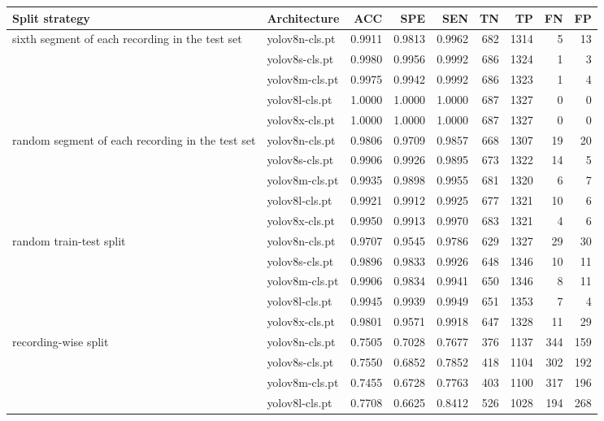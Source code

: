 \begin{table*}
    \centering
    \begin{tabular}{llrrrrrrr}
        \toprule
         Split strategy & Architecture & ACC & SPE & SEN & TN & TP & FN & FP \\
            \midrule
			\multirow{5}{10em}{sixth segment of each recording in the test set} & yolov8n-cls.pt & 0.9911 & 0.9813 & 0.9962 & 682 & 1314 & 5 & 13 \\
			 & yolov8s-cls.pt & 0.9980 & 0.9956 & 0.9992 & 686 & 1324 & 1 & 3 \\
			 & yolov8m-cls.pt & 0.9975 & 0.9942 & 0.9992 & 686 & 1323 & 1 & 4 \\
			 & yolov8l-cls.pt & 1.0000 & 1.0000 & 1.0000 & 687 & 1327 & 0 & 0 \\
			 & yolov8x-cls.pt & 1.0000 & 1.0000 & 1.0000 & 687 & 1327 & 0 & 0 \\\midrule
			\multirow{5}{10em}{random segment of each recording in the test set} & yolov8n-cls.pt & 0.9806 & 0.9709 & 0.9857 & 668 & 1307 & 19 & 20 \\
			 & yolov8s-cls.pt & 0.9906 & 0.9926 & 0.9895 & 673 & 1322 & 14 & 5 \\
			 & yolov8m-cls.pt & 0.9935 & 0.9898 & 0.9955 & 681 & 1320 & 6 & 7 \\
			 & yolov8l-cls.pt & 0.9921 & 0.9912 & 0.9925 & 677 & 1321 & 10 & 6 \\
			 & yolov8x-cls.pt & 0.9950 & 0.9913 & 0.9970 & 683 & 1321 & 4 & 6 \\\midrule
			\multirow{5}{10em}{random train-test split} & yolov8n-cls.pt & 0.9707 & 0.9545 & 0.9786 & 629 & 1327 & 29 & 30 \\
			 & yolov8s-cls.pt & 0.9896 & 0.9833 & 0.9926 & 648 & 1346 & 10 & 11 \\
			 & yolov8m-cls.pt & 0.9906 & 0.9834 & 0.9941 & 650 & 1346 & 8 & 11 \\
			 & yolov8l-cls.pt & 0.9945 & 0.9939 & 0.9949 & 651 & 1353 & 7 & 4 \\
			 & yolov8x-cls.pt & 0.9801 & 0.9571 & 0.9918 & 647 & 1328 & 11 & 29 \\\midrule
			\multirow{5}{10em}{recording-wise split} & yolov8n-cls.pt & 0.7505 & 0.7028 & 0.7677 & 376 & 1137 & 344 & 159 \\
			 & yolov8s-cls.pt & 0.7550 & 0.6852 & 0.7852 & 418 & 1104 & 302 & 192 \\
			 & yolov8m-cls.pt & 0.7455 & 0.6728 & 0.7763 & 403 & 1100 & 317 & 196 \\
			 & yolov8l-cls.pt & 0.7708 & 0.6625 & 0.8412 & 526 & 1028 & 194 & 268 \\

\end{tabular}
\end{table*}

